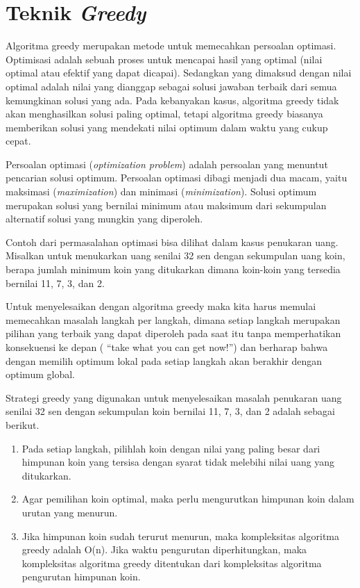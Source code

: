 \chapter{Teknik \textit{Greedy}}

Algoritma greedy merupakan metode untuk memecahkan persoalan optimasi. Optimisasi adalah sebuah proses untuk mencapai hasil yang optimal (nilai optimal atau efektif yang dapat dicapai). Sedangkan yang dimaksud dengan nilai optimal adalah nilai yang dianggap sebagai solusi jawaban terbaik dari semua kemungkinan solusi yang ada. Pada kebanyakan kasus, algoritma greedy tidak akan menghasilkan solusi paling optimal, tetapi algoritma greedy biasanya memberikan solusi yang mendekati nilai optimum dalam waktu yang cukup cepat. 

Persoalan optimasi (\textit{optimization problem}) adalah persoalan yang menuntut pencarian solusi optimum. Persoalan optimasi dibagi menjadi dua macam, yaitu maksimasi (\textit{maximization}) dan minimasi (\textit{minimization}). Solusi optimum merupakan solusi yang bernilai minimum atau maksimum dari sekumpulan alternatif solusi yang mungkin yang diperoleh. 

Contoh dari permasalahan optimasi bisa dilihat dalam kasus penukaran uang. Misalkan untuk menukarkan uang senilai 32 sen dengan sekumpulan uang koin, berapa jumlah minimum koin yang ditukarkan dimana koin-koin yang tersedia bernilai 11, 7, 3, dan 2. 

Untuk menyelesaikan dengan algoritma greedy maka kita harus memulai memecahkan masalah langkah per langkah, dimana setiap langkah merupakan pilihan yang terbaik yang dapat diperoleh pada saat itu tanpa memperhatikan konsekuensi ke depan ( \textquotedblleft take what you can get now!\textquotedblright ) dan	berharap bahwa dengan memilih optimum lokal pada setiap langkah akan berakhir dengan optimum global.

Strategi greedy yang digunakan untuk menyelesaikan masalah penukaran uang senilai 32 sen dengan sekumpulan koin bernilai 11, 7, 3, dan 2 adalah sebagai berikut.

\begin{enumerate}
\item Pada setiap langkah, pilihlah koin dengan nilai yang paling besar dari himpunan koin yang tersisa dengan syarat tidak melebihi nilai uang yang ditukarkan.
\item	Agar pemilihan koin optimal, maka perlu mengurutkan himpunan koin dalam urutan yang menurun. 
\item	Jika himpunan koin sudah terurut menurun, maka kompleksitas algoritma greedy adalah O(n). Jika waktu pengurutan diperhitungkan, maka kompleksitas algoritma greedy ditentukan dari kompleksitas algoritma pengurutan himpunan koin. 

\end{enumerate}

